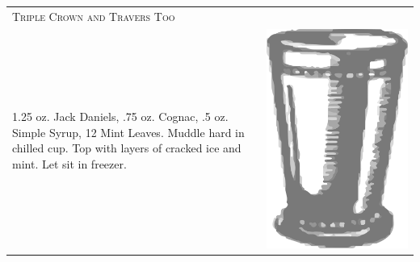 \documentclass{article}
\begin{document}
\begin{multicols}{2}
\begin{tabular}{p{2in} p{0.5in}}
\multicolumn{2}{p{3in}}{\centering\Huge\textsc{Triple Crown and Travers Too}} \\ 
  \vspace{-0.1in}1.25 oz. Jack Daniels, .75 oz. Cognac, .5 oz. Simple Syrup, 12 Mint Leaves. Muddle hard in chilled cup. Top with layers of cracked ice and mint. Let sit in freezer. &
  \vspace{-0.1in} \includegraphics{julep.png}
\end{tabular}


\end{multicols}
\end{document}
